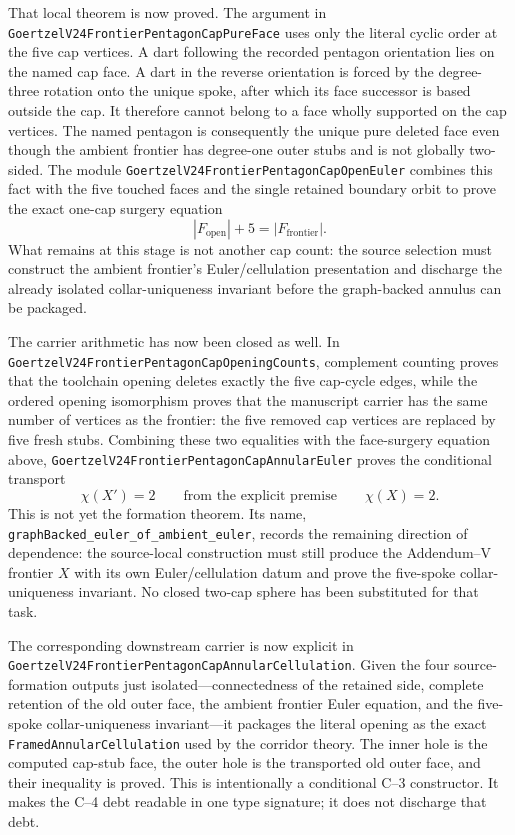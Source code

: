 \documentclass[11pt]{article}
\theoremstyle{definition}
\begin{document}
That local theorem is now proved.  The argument in
\texttt{GoertzelV24FrontierPentagonCapPureFace} uses only the literal cyclic
order at the five cap vertices.  A dart following the recorded pentagon
orientation lies on the named cap face.  A dart in the reverse orientation is
forced by the degree-three rotation onto the unique spoke, after which its
face successor is based outside the cap.  It therefore cannot belong to a
face wholly supported on the cap vertices.  The named pentagon is consequently
the unique pure deleted face even though the ambient frontier has degree-one
outer stubs and is not globally two-sided.  The module
\texttt{GoertzelV24FrontierPentagonCapOpenEuler} combines this fact with the
five touched faces and the single retained boundary orbit to prove the exact
one-cap surgery equation
\[
  |F_{\mathrm{open}}|+5=|F_{\mathrm{frontier}}|.
\]
What remains at this stage is not another cap count: the source selection must
construct the ambient frontier's Euler/cellulation presentation and discharge
the already isolated collar-uniqueness invariant before the graph-backed
annulus can be packaged.

The carrier arithmetic has now been closed as well.  In
\texttt{GoertzelV24FrontierPentagonCapOpeningCounts}, complement counting
proves that the toolchain opening deletes exactly the five cap-cycle edges,
while the ordered opening isomorphism proves that the manuscript carrier has
the same number of vertices as the frontier: the five removed cap vertices
are replaced by five fresh stubs.  Combining these two equalities with the
face-surgery equation above,
\texttt{GoertzelV24FrontierPentagonCapAnnularEuler} proves the conditional
transport
\[
  \chi(X')=2 \qquad\text{from the explicit premise}\qquad \chi(X)=2.
\]
This is not yet the formation theorem.  Its name,
\texttt{graphBacked\_euler\_of\_ambient\_euler}, records the remaining
direction of dependence: the source-local construction must still produce
the Addendum--V frontier $X$ with its own Euler/cellulation datum and prove
the five-spoke collar-uniqueness invariant.  No closed two-cap sphere has
been substituted for that task.

The corresponding downstream carrier is now explicit in
\texttt{GoertzelV24FrontierPentagonCapAnnularCellulation}.  Given the four
source-formation outputs just isolated---connectedness of the retained side,
complete retention of the old outer face, the ambient frontier Euler
equation, and the five-spoke collar-uniqueness invariant---it packages the
literal opening as the exact \texttt{FramedAnnularCellulation} used by the
corridor theory.  The inner hole is the computed cap-stub face, the outer
hole is the transported old outer face, and their inequality is proved.
This is intentionally a conditional C--3 constructor.  It makes the C--4
debt readable in one type signature; it does not discharge that debt.
\end{document}
